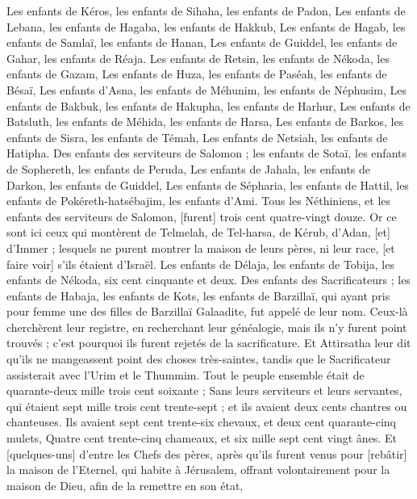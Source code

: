 \begin{multicols}{2}
Les enfants de Kéros, les enfants de Sihaha, les enfants de Padon,
Les enfants de Lebana, les enfants de Hagaba, les enfants de Hakkub,
Les enfants de Hagab, les enfants de Samlaï, les enfants de Hanan,
Les enfants de Guiddel, les enfants de Gahar, les enfants de Réaja.
Les enfants de Retsin, les enfants de Nékoda, les enfants de Gazam,
Les enfants de Huza, les enfants de Paséah, les enfants de Bésaï,
Les enfants d'Asna, les enfants de Méhunim, les enfants de Néphusim,
Les enfants de Bakbuk, les enfants de Hakupha, les enfants de Harhur,
Les enfants de Batsluth, les enfants de Méhida, les enfants de Harsa,
Les enfants de Barkos, les enfants de Sisra, les enfants de Témah,
Les enfants de Netsiah, les enfants de Hatipha.
Des enfants des serviteurs de Salomon ; les enfants de Sotaï, les enfants de Sophereth, les enfants de Peruda,
Les enfants de Jahala, les enfants de Darkon, les enfants de Guiddel,
Les enfants de Sépharia, les enfants de Hattil, les enfants de Pokéreth-hatsébajim, les enfants d'Ami.
Tous les Néthiniens, et les enfants des serviteurs de Salomon, [furent] trois cent quatre-vingt douze.
Or ce sont ici ceux qui montèrent de Telmelah, de Tel-harsa, de Kérub, d'Adan, [et] d'Immer ; lesquels ne purent montrer la maison de leurs pères, ni leur race, [et faire voir] s'ils étaient d'Israël.
Les enfants de Délaja, les enfants de Tobija, les enfants de Nékoda, six cent cinquante et deux.
Des enfants des Sacrificateurs ; les enfants de Habaja, les enfants de Kots, les enfants de Barzillaï, qui ayant pris pour femme une des filles de Barzillaï Galaadite, fut appelé de leur nom.
Ceux-là cherchèrent leur registre, en recherchant leur généalogie, mais ils n'y furent point trouvés ; c'est pourquoi ils furent rejetés de la sacrificature.
Et Attirsatha leur dit qu'ils ne mangeassent point des choses très-saintes, tandis que le Sacrificateur assisterait avec l'Urim et le Thummim.
Tout le peuple ensemble était de quarante-deux mille trois cent soixante ;
Sans leurs serviteurs et leurs servantes, qui étaient sept mille trois cent trente-sept ; et ils avaient deux cents chantres ou chanteuses.
Ils avaient sept cent trente-six chevaux, et deux cent quarante-cinq mulets,
Quatre cent trente-cinq chameaux, et six mille sept cent vingt ânes.
Et [quelques-uns] d'entre les Chefs des pères, après qu'ils furent venus pour [rebâtir] la maison de l'Eternel, qui habite à Jérusalem, offrant volontairement pour la maison de Dieu, afin de la remettre en son état,

\end{multicols}
